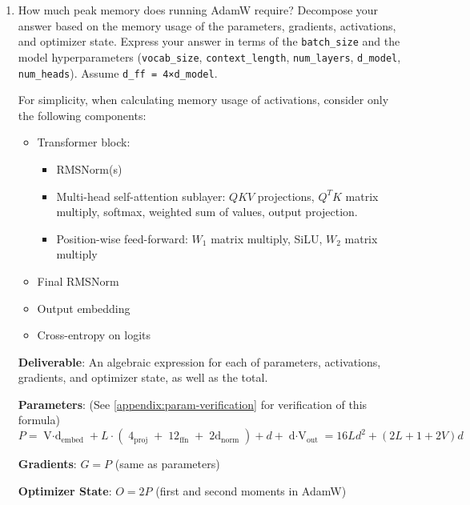\begin{enumerate}[label=(\alph*)]
    \item How much peak memory does running AdamW require? Decompose your answer based on the memory usage of the parameters, gradients, activations, and optimizer state. Express your answer in terms of the \lstinline{batch_size} and the model hyperparameters (\lstinline{vocab_size}, \lstinline{context_length}, \lstinline{num_layers}, \lstinline{d_model}, \lstinline{num_heads}). Assume \lstinline{d_ff = 4×d_model}.

    For simplicity, when calculating memory usage of activations, consider only the following components:
    \begin{itemize}
        \item Transformer block:
        \begin{itemize}
            \item RMSNorm(s)
            \item Multi-head self-attention sublayer: $QKV$ projections, $Q^T K$ matrix multiply, softmax, weighted sum of values, output projection.
            \item Position-wise feed-forward: $W_1$ matrix multiply, SiLU, $W_2$ matrix multiply
        \end{itemize}
        \item Final RMSNorm
        \item Output embedding
        \item Cross-entropy on logits
    \end{itemize}

    \textbf{Deliverable}: An algebraic expression for each of parameters, activations, gradients, and optimizer state, as well as the total.

    \begin{answer}
    \textbf{Parameters}: (See \ref{appendix:param-verification} for verification of this formula)
    \begin{equation*}
        P = \mathop{V \cdot d}_{\text{embed}} + 
        L \cdot (
            \mathop{4d^2}_{\text{proj}} + 
            \mathop{12d^2}_{\text{ffn}} + 
            \mathop{2d}_{\text{norm}}
        ) + d + \mathop{d \cdot V}_{\text{out}} 
        = 16L d^2 + (2L + 1 + 2V)d
    \end{equation*}

    \textbf{Gradients}: $G = P$ (same as parameters)

    \textbf{Optimizer State}: $O = 2P$ (first and second moments in AdamW)


\end{answer}
\end{enumerate}
